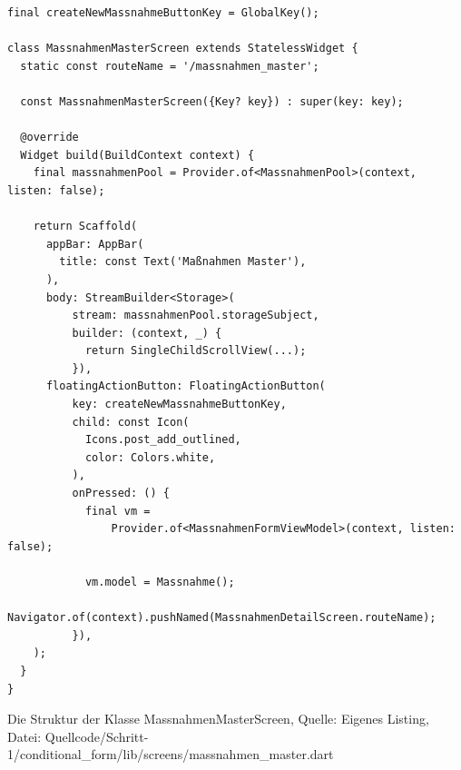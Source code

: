 \begin{listing}[htbp]
    \begin{verbatim}
final createNewMassnahmeButtonKey = GlobalKey();

class MassnahmenMasterScreen extends StatelessWidget {
  static const routeName = '/massnahmen_master';

  const MassnahmenMasterScreen({Key? key}) : super(key: key);

  @override
  Widget build(BuildContext context) {
    final massnahmenPool = Provider.of<MassnahmenPool>(context, listen: false);

    return Scaffold(
      appBar: AppBar(
        title: const Text('Maßnahmen Master'),
      ),
      body: StreamBuilder<Storage>(
          stream: massnahmenPool.storageSubject,
          builder: (context, _) {
            return SingleChildScrollView(...);
          }),
      floatingActionButton: FloatingActionButton(
          key: createNewMassnahmeButtonKey,
          child: const Icon(
            Icons.post_add_outlined,
            color: Colors.white,
          ),
          onPressed: () {
            final vm =
                Provider.of<MassnahmenFormViewModel>(context, listen: false);

            vm.model = Massnahme();
            Navigator.of(context).pushNamed(MassnahmenDetailScreen.routeName);
          }),
    );
  }
}

\end{verbatim}
\caption[Schritt 1 Klasse MassnahmenMasterScreen Struktur]{Die Struktur der Klasse MassnahmenMasterScreen, Quelle: Eigenes Listing, \newline Datei: Quellcode/Schritt-1/conditional_form/lib/screens/massnahmen_master.dart}

\label{lst:Schritt1KlasseMassnahmenMasterScreenStruktur}
\end{listing}




